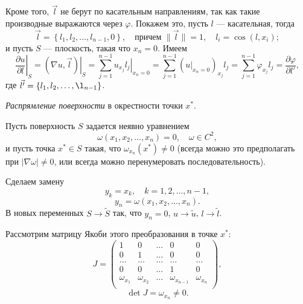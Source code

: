 \documentclass[12pt,a5paper]{book}
\begin{document}
	Кроме того, $\vec{l}$ не берут по касательным направлениям, так как такие производные выражаются через $\varphi$. Покажем это, пусть $l$ --- касательная, тогда
	\begin{equation}
		\vec{l} = \left\{l_1,l_2,\dots,l_{n-1},0\right\}, \quad \text{причем } \|\vec{l}\| = 1, \quad l_i = \cos{\left(l, x_i\right)};
	\end{equation}
	и пусть $S$ --- плоскость, такая что $x_n = 0$. Имеем
	\begin{equation*}
		\left.\frac{\partial u}{\partial l}\right|_S = \left.\left(\nabla u, \vec{l}\right)\right|_S = \sum_{j=1}^{n-1} \left.u_{x_j}l_j\right|_{x_n=0} = \sum_{j=1}^{n-1} \left(\left.u\right|_{x_n=0}\right)_{x_j}l_j = \sum_{j=1}^{n-1} \varphi_{x_j}l_j = \frac{\partial \varphi}{\partial l'},
	\end{equation*}
	где $\vec{l'} = \left\{l_1,l_2,\dots,\l_{n-1}\right\}$.
	
	\vspace*{1em}
	\emph{Распрямление поверхности} в окрестности точки $x^*$.
	
	\noindent Пусть поверхность $S$ задается неявно уравнением
	\begin{equation*}
		\omega(x_1,x_2,\dots,x_n) = 0, \quad \omega \in C^2,
	\end{equation*}
	и пусть точка $x^* \in S$ такая, что $\omega_{x_n}(x^*) \neq 0$ (всегда можно это предполагать при $|\nabla\omega|\neq0$, или всегда можно перенумеровать последовательность).
	
	Сделаем замену
	\begin{equation*}
		y_k = x_k, \quad k = 1, 2, \dots, n-1,
	\end{equation*}
	\begin{equation*}
		y_n = \omega(x_1,x_2,\dots,x_n).
	\end{equation*}
	В новых переменных $S \rightarrow \tilde{S}$ так, что $y_n = 0$, $u \rightarrow \tilde{u}$, $l \rightarrow \tilde{l}$.
	
	Рассмотрим матрицу Якоби этого преобразования в точке $x^*$:
	\begin{equation*}
		J = \begin{pmatrix}
			1 & 0 & \dots & 0 & 0 \\
			0 & 1 & \dots & 0 & 0 \\
			\dots & \dots & \dots & \dots & \dots \\
			0 & 0 & \dots & 1 & 0 \\
			\omega_{x_1} & \omega_{x_2} & \dots & \omega_{x_{n-1}} & \omega_{x_n} \\
		\end{pmatrix},
	\end{equation*}
	\begin{equation*}
		\det{J} = \omega_{x_n} \neq 0.
	\end{equation*}
	
\end{document}
